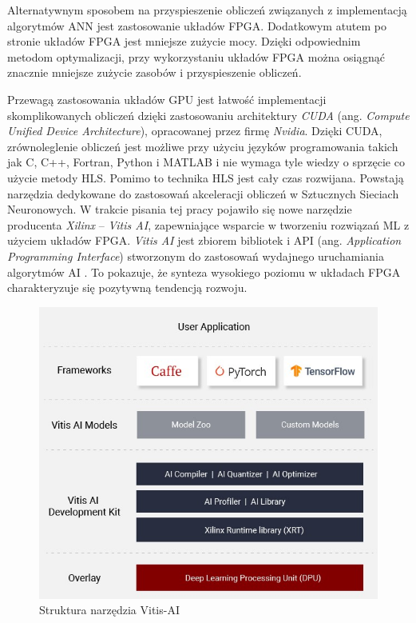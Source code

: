 Alternatywnym sposobem na przyspieszenie obliczeń związanych z implementacją algorytmów ANN jest zastosowanie układów FPGA. Dodatkowym atutem po stronie układów FPGA jest mniejsze zużycie mocy. Dzięki odpowiednim metodom optymalizacji, przy wykorzystaniu układów FPGA można osiągnąć znacznie mniejsze zużycie zasobów i przyspieszenie obliczeń.

Przewagą zastosowania układów GPU jest łatwość implementacji skomplikowanych obliczeń dzięki zastosowaniu architektury \emph
{CUDA} (ang. \emph{Compute Unified Device Architecture}), opracowanej przez firmę \emph{Nvidia}. Dzięki CUDA, zrównoleglenie obliczeń jest możliwe przy użyciu języków programowania takich jak C, C++, Fortran, Python i MATLAB \cite{cuda} i nie wymaga tyle wiedzy o sprzęcie co użycie metody HLS. Pomimo to technika HLS jest cały czas rozwijana. Powstają narzędzia dedykowane do zastosowań akceleracji obliczeń w Sztucznych Sieciach Neuronowych. W trakcie pisania tej pracy pojawiło się nowe narzędzie producenta \emph{Xilinx} -- \emph{Vitis AI}, zapewniające wsparcie w tworzeniu rozwiązań ML z użyciem układów FPGA. \emph{Vitis AI} jest zbiorem bibliotek i API (ang. \emph{Application Programming Interface}) stworzonym do zastosowań wydajnego uruchamiania algorytmów AI \cite{vitis-ai}. To pokazuje, że synteza wysokiego poziomu w układach FPGA charakteryzuje się pozytywną tendencją rozwoju.

\begin{figure}[h]
    \centering
    \includegraphics[width=\textwidth]{img/vitis-AI.jpg}
    \caption{Struktura narzędzia Vitis-AI}
    \label{vitisAI}
  \end{figure}

